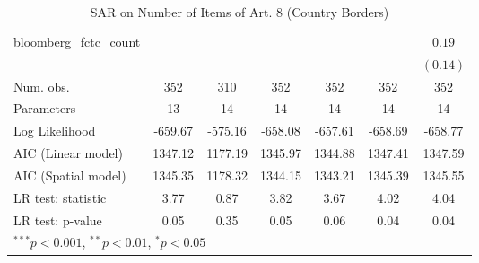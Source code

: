 \begin{table}[!h]
\begin{center}
\begin{tabular}{l c c c c c c }
bloomberg\_fctc\_count  &              &              &              &              &              & $0.19$       \\
                        &              &              &              &              &              & $(0.14)$     \\
\midrule
Num. obs.               & 352          & 310          & 352          & 352          & 352          & 352          \\
Parameters              & 13           & 14           & 14           & 14           & 14           & 14           \\
Log Likelihood          & -659.67      & -575.16      & -658.08      & -657.61      & -658.69      & -658.77      \\
AIC (Linear model)      & 1347.12      & 1177.19      & 1345.97      & 1344.88      & 1347.41      & 1347.59      \\
AIC (Spatial model)     & 1345.35      & 1178.32      & 1344.15      & 1343.21      & 1345.39      & 1345.55      \\
LR test: statistic      & 3.77         & 0.87         & 3.82         & 3.67         & 4.02         & 4.04         \\
LR test: p-value        & 0.05         & 0.35         & 0.05         & 0.06         & 0.04         & 0.04         \\
\bottomrule
\multicolumn{7}{l}{\scriptsize{$^{***}p<0.001$, $^{**}p<0.01$, $^*p<0.05$}}
\end{tabular}
\caption{SAR on Number of Items of Art. 8 (Country Borders)}
\label{table:coefficients}
\end{center}
\end{table}
